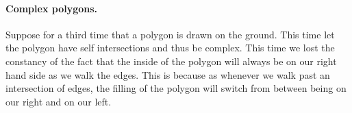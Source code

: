 \documentclass{article}
\begin{document}
\paragraph{Complex polygons.} Suppose for a third time that a polygon is drawn on the ground. This time let the polygon have self intersections and thus be complex. This time we lost the constancy of the fact that the inside of the polygon will always be on our right hand side as we walk the edges. This is because as whenever we walk past an intersection of edges, the filling of the polygon will switch from between being on our right and on our left.
\end{document}
